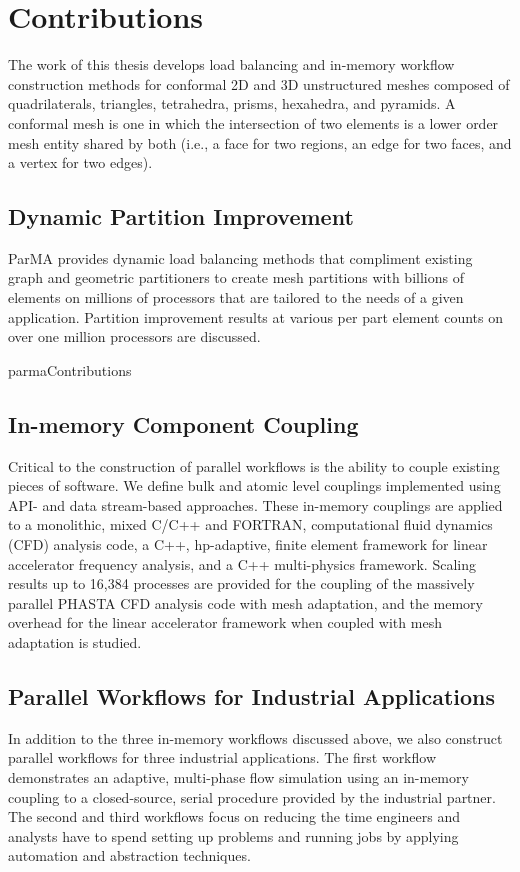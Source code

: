 \section{Contributions}
The work of this thesis develops load balancing and in-memory workflow construction
methods for conformal 2D and 3D unstructured meshes composed of quadrilaterals,
triangles, tetrahedra, prisms, hexahedra, and pyramids.
A conformal mesh is one in which the intersection of two elements is a lower
order mesh entity shared by both (i.e., a face for two regions, an edge for two faces,
and a vertex for two edges).

\subsection{Dynamic Partition Improvement}
ParMA provides dynamic load balancing methods that compliment existing graph and
geometric partitioners to create mesh partitions with billions of elements
on millions of processors that are tailored to the needs of a given application.
Partition improvement results at various per part element counts on over one
million processors are discussed.

{parmaContributions}

\subsection{In-memory Component Coupling}
Critical to the construction of parallel workflows is the ability to couple existing
pieces of software.
We define bulk and atomic level couplings implemented using API- and data
stream-based approaches.
These in-memory couplings are applied to a monolithic, mixed C/C++ and FORTRAN,
computational fluid dynamics (CFD) analysis code, a C++, hp-adaptive, finite
element framework for linear accelerator frequency analysis, and a C++
multi-physics framework.
Scaling results up to 16,384 processes are provided for the coupling of the
massively parallel PHASTA CFD analysis code with mesh adaptation, and the memory
overhead for the linear accelerator framework when coupled with mesh adaptation
is studied.

\subsection{Parallel Workflows for Industrial Applications}
In addition to the three in-memory workflows discussed above, we also construct
parallel workflows for three industrial applications.
The first workflow demonstrates an adaptive, multi-phase flow simulation using an
in-memory coupling to a closed-source, serial procedure provided by the
industrial partner.
The second and third workflows focus on reducing the time engineers and analysts
have to spend setting up problems and running jobs by applying automation and
abstraction techniques.

